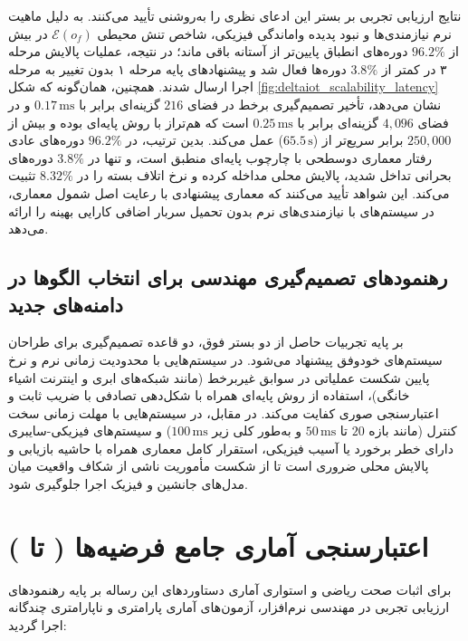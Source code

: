 \documentclass[oneside,openany,phd]{TMU-Thesis}
\begin{document}
نتایج ارزیابی تجربی بر بستر  این ادعای نظری را به‌روشنی تأیید می‌کنند. به دلیل ماهیت نرم نیازمندی‌ها و نبود پدیده واماندگی فیزیکی، شاخص تنش محیطی $\mathcal{E}(o_f)$ در بیش از $96.2\%$ دوره‌های انطباق پایین‌تر از آستانه باقی ماند؛ در نتیجه، عملیات پالایش مرحله ۳ در کمتر از $3.8\%$ دوره‌ها فعال شد و پیشنهادهای پایه مرحله ۱ بدون تغییر به مرحله اجرا ارسال شدند. همچنین، همان‌گونه که شکل \ref{fig:deltaiot_scalability_latency} نشان می‌دهد، تأخیر تصمیم‌گیری برخط \rsdrlplus در فضای $216$ گزینه‌ای برابر با $0.17\,\text{ms}$ و در فضای $4{,}096$ گزینه‌ای  برابر با $0.25\,\text{ms}$ است که هم‌تراز با روش پایه‌ای بوده و بیش از $250{,}000$ برابر سریع‌تر از  ($65.5\,\text{s}$) عمل می‌کند. بدین ترتیب، در $96.2\%$ دوره‌های عادی رفتار معماری دوسطحی با چارچوب پایه‌ای منطبق است، و تنها در $3.8\%$ دوره‌های بحرانی تداخل شدید، پالایش محلی مداخله کرده و نرخ اتلاف بسته را در $8.32\%$ تثبیت می‌کند. این شواهد تأیید می‌کنند که معماری پیشنهادی با رعایت اصل شمول معماری، در سیستم‌های با نیازمندی‌های نرم بدون تحمیل سربار اضافی کارایی بهینه را ارائه می‌دهد.

\subsection{رهنمودهای تصمیم‌گیری مهندسی برای انتخاب الگوها در دامنه‌های جدید}
بر پایه تجربیات حاصل از دو بستر فوق، دو قاعده تصمیم‌گیری برای طراحان سیستم‌های خودوفق پیشنهاد می‌شود. در سیستم‌هایی با محدودیت زمانی نرم و نرخ پایین شکست عملیاتی در سوابق غیربرخط (مانند شبکه‌های ابری و اینترنت اشیاء خانگی)، استفاده از روش پایه‌ای  همراه با شکل‌دهی تصادفی با ضریب ثابت و اعتبارسنجی صوری  کفایت می‌کند. در مقابل، در سیستم‌هایی با مهلت زمانی سخت کنترل (مانند بازه $20$ تا $50\,\text{ms}$ و به‌طور کلی زیر $100\,\text{ms}$) و سیستم‌های فیزیکی-سایبری دارای خطر برخورد یا آسیب فیزیکی، استقرار کامل معماری \rsdrlplus همراه با حاشیه بازیابی \mursdrl و پالایش محلی \pgalr ضروری است تا از شکست مأموریت ناشی از شکاف واقعیت میان مدل‌های جانشین و فیزیک اجرا جلوگیری شود.

\section{اعتبارسنجی آماری جامع فرضیه‌ها ( تا )}
\label{sec:comprehensive_statistical_validation}

برای اثبات صحت ریاضی و استواری آماری دستاوردهای این رساله بر پایه رهنمودهای ارزیابی تجربی در مهندسی نرم‌افزار، آزمون‌های آماری پارامتری و ناپارامتری چندگانه اجرا گردید:
\end{document}
